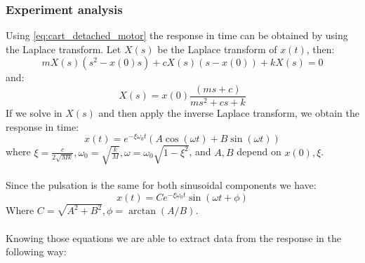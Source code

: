 \subsubsection{Experiment analysis}
Using \ref{eq:cart_detached_motor} the response in time can be obtained by using the Laplace transform. Let $X(s)$ be the Laplace transform of $x(t)$, then:
$$mX(s)(s^2-x(0)s) +c X(s) (s-x(0)) +kX(s)=0$$
and:
$$X(s) = x(0) \frac{(ms+c)}{ms^2+cs+k}$$
If we solve in $X(s)$ and then apply the inverse Laplace transform, we obtain the response in time:
$$x(t) = e^{-\xi \omega_0 t}(A\cos(\omega t)+B\sin(\omega t))$$
where $\xi = \frac{c}{2\sqrt{Mk}}, \omega_0 = \sqrt{\frac{k}{M}}, \omega = \omega_0 \sqrt{1-\xi^2}$, and $A,B$ depend on $x(0), \xi$. \\ \\
Since the pulsation is the same for both sinusoidal components we have:
$$x(t) = C e^{-\xi \omega_0 t} \sin(\omega t+ \phi)$$
Where  $C= \sqrt{A^2+B^2}, \phi = \arctan(A/B)$.
\\ \\
Knowing those equations we  are able to extract data from the response in the following way:
